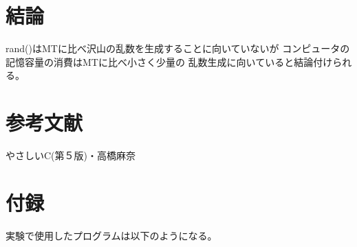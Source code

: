 \documentclass{jsarticle}
\begin{document}
\section{結論}
rand()はMTに比べ沢山の乱数を生成することに向いていないが
コンピュータの記憶容量の消費はMTに比べ小さく少量の
乱数生成に向いていると結論付けられる。

\section{参考文献}
\begin{thebibliography}{9}
   やさしいC(第５版)・高橋麻奈
\end{thebibliography}

\section{付録}
実験で使用したプログラムは以下のようになる。


\end{document}
